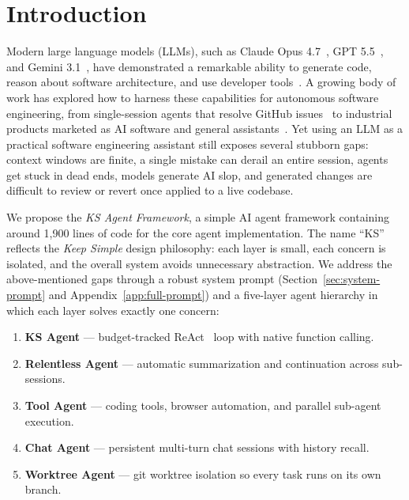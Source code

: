 \documentclass{article}
\begin{document}
\section{Introduction}
\label{sec:intro}

Modern large language models (LLMs), such as Claude Opus 4.7~\citep{anthropic2026opus47}, GPT 5.5~\citep{openai2026gpt55}, and Gemini 3.1~\citep{google2026gemini31}, have demonstrated a remarkable ability to generate code, reason about software architecture, and use developer tools~\citep{chen2021evaluating,roziere2023code}.  A growing body of work has explored how to harness these capabilities for autonomous software engineering, from single-session agents that resolve GitHub issues~\citep{yang2024sweagent,wang2024openhands} to industrial products marketed as AI software and general assistants~\citep{copilot2021,cursor2024,devin2024,claudecode2025,codex2025,openclaw2025}.  Yet using an LLM as a practical software engineering assistant still exposes several stubborn gaps: context windows are finite, a single mistake can derail an entire session, agents get stuck in dead ends, models generate AI slop, and generated changes are difficult to review or revert once applied to a live codebase.

We propose the \emph{KS Agent Framework}, a simple AI agent framework containing around 1,900 lines of code for the core agent implementation.  The name ``KS'' reflects the \emph{Keep Simple} design philosophy: each layer is small, each concern is isolated, and the overall system avoids unnecessary abstraction.  We address the above-mentioned gaps through a robust system prompt (Section~\ref{sec:system-prompt} and Appendix~\ref{app:full-prompt}) and a five-layer agent hierarchy in which each layer solves exactly one concern:

\begin{enumerate}[nosep]
  \item \textbf{KS Agent} --- budget-tracked ReAct~\citep{yao2023react} loop with native function calling.
  \item \textbf{Relentless Agent} --- automatic summarization and continuation across sub-sessions.
  \item \textbf{Tool Agent} --- coding tools, browser automation, and parallel sub-agent execution.
  \item \textbf{Chat Agent} --- persistent multi-turn chat sessions with history recall.
  \item \textbf{Worktree Agent} --- git worktree isolation so every task runs on its own branch.
\end{enumerate}
\end{document}
